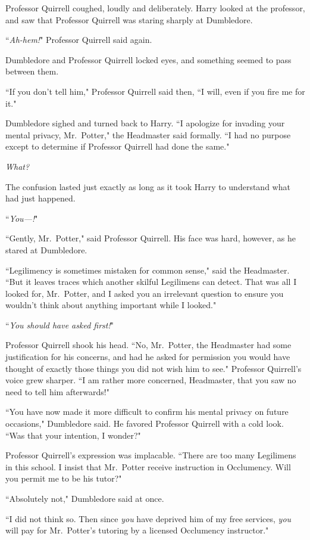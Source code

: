 Professor Quirrell coughed, loudly and deliberately. Harry looked at the professor, and saw that Professor Quirrell was staring sharply at Dumbledore.

``\emph{Ah-hem!}" Professor Quirrell said again.

Dumbledore and Professor Quirrell locked eyes, and something seemed to pass between them.

``If you don't tell him," Professor Quirrell said then, ``I will, even if you fire me for it."

Dumbledore sighed and turned back to Harry. ``I apologize for invading your mental privacy, Mr.~Potter," the Headmaster said formally. ``I had no purpose except to determine if Professor Quirrell had done the same."

\emph{What?}

The confusion lasted just exactly as long as it took Harry to understand what had just happened.

``\emph{You—!}"

``Gently, Mr.~Potter," said Professor Quirrell. His face was hard, however, as he stared at Dumbledore.

``Legilimency is sometimes mistaken for common sense," said the Headmaster. ``But it leaves traces which another skilful Legilimens can detect. That was all I looked for, Mr.~Potter, and I asked you an irrelevant question to ensure you wouldn't think about anything important while I looked."

``\emph{You should have asked first!}"

Professor Quirrell shook his head. ``No, Mr.~Potter, the Headmaster had some justification for his concerns, and had he asked for permission you would have thought of exactly those things you did not wish him to see." Professor Quirrell's voice grew sharper. ``I am rather more concerned, Headmaster, that you saw no need to tell him afterwards!"

``You have now made it more difficult to confirm his mental privacy on future occasions," Dumbledore said. He favored Professor Quirrell with a cold look. ``Was that your intention, I wonder?"

Professor Quirrell's expression was implacable. ``There are too many Legilimens in this school. I insist that Mr.~Potter receive instruction in Occlumency. Will you permit me to be his tutor?"

``Absolutely not," Dumbledore said at once.

``I did not think so. Then since \emph{you} have deprived him of my free services, \emph{you} will pay for Mr.~Potter's tutoring by a licensed Occlumency instructor."

